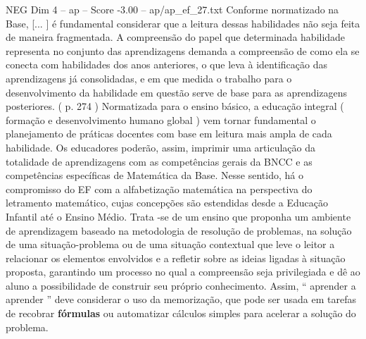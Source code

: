 \begin{textsample}{NEG Dim 4 – ap – Score -3.00 – ap/ap\_ef\_27.txt}
Conforme normatizado na Base, [... ] é fundamental considerar que a leitura dessas habilidades não seja feita de maneira fragmentada.
A compreensão do papel que determinada habilidade representa no conjunto das aprendizagens demanda a compreensão de como ela se conecta com habilidades dos anos anteriores, o que leva à identificação das aprendizagens já consolidadas, e em que medida o trabalho para o desenvolvimento da habilidade em questão serve de base para as aprendizagens posteriores. ( p. 274 ) Normatizada para o ensino básico, a educação integral ( formação e desenvolvimento humano global ) vem tornar fundamental o planejamento de práticas docentes com base em leitura mais ampla de cada habilidade.
Os educadores poderão, assim, imprimir uma articulação da totalidade de aprendizagens com as competências gerais da BNCC e as competências específicas de Matemática da Base.
Nesse sentido, há o compromisso do EF com a alfabetização matemática na perspectiva do letramento matemático, cujas concepções são estendidas desde a Educação Infantil até o Ensino Médio.
Trata -se de um ensino que proponha um ambiente de aprendizagem baseado na metodologia de resolução de problemas, na solução de uma situação-problema ou de uma situação contextual que leve o leitor a relacionar os elementos envolvidos e a refletir sobre as ideias ligadas à situação proposta, garantindo um processo no qual a compreensão seja privilegiada e dê ao aluno a possibilidade de construir seu próprio conhecimento.
Assim, “ aprender a aprender ” deve considerar o uso da memorização, que pode ser usada em tarefas de recobrar \textbf{fórmulas} ou automatizar cálculos simples para acelerar a solução do problema.

\end{textsample}
